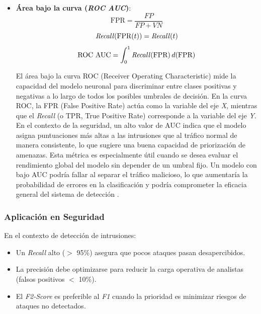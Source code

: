 \begin{itemize}
\item \textbf{Área bajo la curva (\textit{ROC AUC})}: \label{met:ROCAUC}
\begin{equation}
    \text{FPR} = \frac{FP}{FP + VN}
\end{equation}
\begin{equation}
    \text{\textit{Recall}}(\text{FPR}(t)) = \text{\textit{Recall}}(t)
\end{equation}
\begin{equation}
    \text{ROC AUC} = \int_{0}^{1} \text{\textit{Recall}}(\text{FPR}) \, d(\text{FPR})
\end{equation}



El área bajo la curva ROC (Receiver Operating Characteristic) mide la capacidad del modelo neuronal para discriminar entre clases positivas y negativas a lo largo de todos los posibles umbrales de decisión. 
En la curva ROC, la FPR (False Positive Rate) actúa como la variable del eje \textit{X}, mientras que el \textit{Recall} (o TPR, True Positive Rate) corresponde a la variable del eje \textit{Y}. En el contexto de la seguridad, un alto valor de AUC indica que el modelo asigna puntuaciones más altas a las intrusiones que al tráfico normal de manera consistente, lo que sugiere una buena capacidad de priorización de amenazas. Esta métrica es especialmente útil cuando se desea evaluar el rendimiento global del modelo sin depender de un umbral fijo. Un modelo con bajo AUC podría fallar al separar el tráfico malicioso, lo que aumentaría la probabilidad de errores en la clasificación y podría comprometer la eficacia general del sistema de detección \cite{fawcett2006introduction}.

\end{itemize}

\subsubsection{Aplicación en Seguridad}	\label{sec:apli-met-seg}
En el contexto de detección de intrusiones:
\begin{itemize}
    \item Un \textit{Recall} alto ($>$ 95\%) asegura que pocos ataques pasan desapercibidos.
    \item La precisión debe optimizarse para reducir la carga operativa de analistas (falsos positivos $<$ 10\%).
    \item El \textit{F2-Score} es preferible al \textit{F1} cuando la prioridad es minimizar riesgos de ataques no detectados.
\end{itemize}




